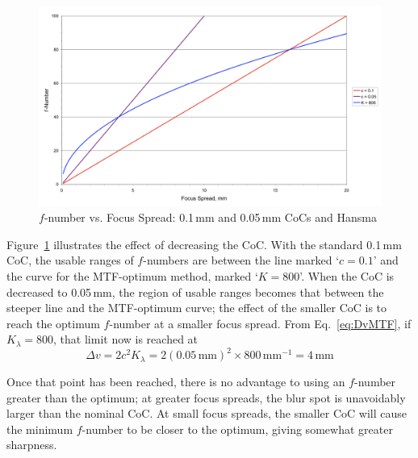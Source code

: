 \documentclass[11pt, oneside]{scrartcl}   	%
\begin{document}
\begin{figure}[htbp] %
   \centering
   \includegraphics[width=\linewidth]{figure/fig_dofd_14} 
   \caption{$f$-number vs. Focus Spread: 0.1\,mm and 0.05\,mm CoCs and Hansma}
   \label{fig:fvsfspread}
\end{figure}
Figure~\ref{fig:fvsfspread} illustrates the effect of decreasing the CoC. With the standard 0.1\,mm CoC, the usable ranges of $f$-numbers are between the line marked ‘$c = 0.1$’ and the curve for the MTF-optimum method, marked ‘$K = 800$’. When the CoC is decreased to 0.05\,mm, the region of usable ranges becomes that between the steeper line and the MTF-optimum curve; the effect of the smaller CoC is to reach the optimum $f$-number at a smaller focus spread. From Eq.~\ref{eq:DvMTF}, if $K_λ = 800$, that limit now is reached at
\begin{equation}
Δv = 2c^2K_λ =2(0.05\,\mathrm{mm})^2×800\,\mathrm{mm}^{-1}=4\,\mathrm{mm}
\end{equation}

Once that point has been reached, there is no advantage to using an $f$-number greater than the optimum; at greater focus spreads, the blur spot is unavoidably larger than the nominal CoC. At small focus spreads, the smaller CoC will cause the minimum $f$-number to be closer to the optimum, giving somewhat greater sharpness.
\end{document}
